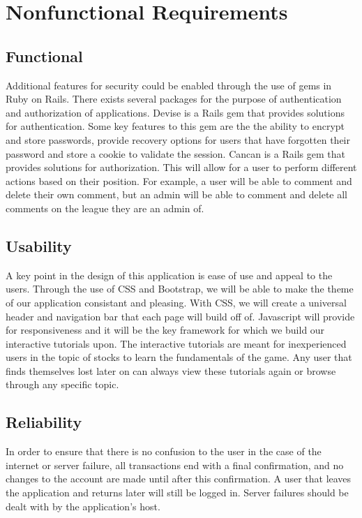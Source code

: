 \section{Nonfunctional Requirements}

\subsection{Functional}
Additional features for security could be enabled through the use of gems in Ruby on Rails. There exists several packages for the purpose of authentication and authorization of applications. 
Devise is a Rails gem that provides solutions for authentication. Some key features to this gem are the the ability to encrypt and store passwords, provide recovery options for users that have forgotten their password and store a cookie to validate the session. 
Cancan is a Rails gem that provides solutions for authorization. This will allow for a user to perform different actions based on their position. For example, a user will be able to comment and delete their own comment, but an admin will be able to comment and delete all comments on the league they are an admin of.


\subsection{Usability}
A key point in the design of this application is ease of use and appeal to the users. Through the use of CSS and Bootstrap, we will be able to make the theme of our application consistant and pleasing. With CSS, we will create a universal header and navigation bar that each page will build off of. Javascript will provide for responsiveness and it will be the key framework for which we build our interactive tutorials upon. The interactive tutorials are meant for inexperienced users in the topic of stocks to learn the fundamentals of the game. Any user that finds themselves lost later on can always view these tutorials again or browse through any specific topic.


\subsection{Reliability}
In order to ensure that there is no confusion to the user in the case of the internet or server failure, all transactions end with a final confirmation, and no changes to the account are made until after this confirmation. A user that leaves the application and returns later will still be logged in. Server failures should be dealt with by the application's host.


